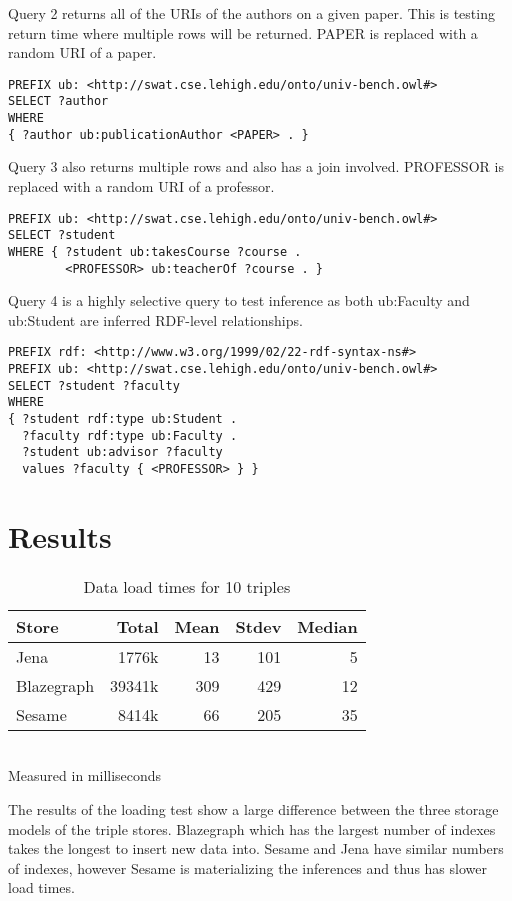 \documentclass{llncs}
\begin{document}
\smallskip

Query 2 returns all of the URIs of the authors on a given paper.  This is testing return time where multiple rows will be returned.  PAPER is replaced with a random URI of a paper.

\begin{lstlisting}[caption=Query 2]
PREFIX ub: <http://swat.cse.lehigh.edu/onto/univ-bench.owl#>
SELECT ?author
WHERE
{ ?author ub:publicationAuthor <PAPER> . }
\end{lstlisting}
\smallskip

Query 3 also returns multiple rows and also has a join involved.  PROFESSOR is replaced with a random URI of a professor.

\begin{lstlisting}[caption=Query 3]
PREFIX ub: <http://swat.cse.lehigh.edu/onto/univ-bench.owl#>
SELECT ?student
WHERE { ?student ub:takesCourse ?course .
        <PROFESSOR> ub:teacherOf ?course . }
\end{lstlisting}

\smallskip

Query 4 is a highly selective query to test inference as both ub:Faculty and ub:Student are inferred RDF-level relationships.

\begin{lstlisting}[caption=Query 4]
PREFIX rdf: <http://www.w3.org/1999/02/22-rdf-syntax-ns#>
PREFIX ub: <http://swat.cse.lehigh.edu/onto/univ-bench.owl#>
SELECT ?student ?faculty
WHERE
{ ?student rdf:type ub:Student .
  ?faculty rdf:type ub:Faculty .
  ?student ub:advisor ?faculty 
  values ?faculty { <PROFESSOR> } }
\end{lstlisting}

\section{Results}
\begin{table}
\begin{center}
\caption{Data load times for 10 triples}
\begin{tabular}{l | r r r r }
Store & Total & Mean & Stdev & Median \\
\hline
Jena & 1776k & 13 & 101 & 5 \\
Blazegraph & 39341k & 309 & 429 & 12 \\
Sesame & 8414k & 66 & 205 & 35
\end{tabular}
\\[5pt]
Measured in milliseconds
\end{center}
\end{table}
The results of the loading test show a large difference between the three storage models of the triple stores.  Blazegraph which has the largest number of indexes takes the longest to insert new data into. Sesame and Jena have similar numbers of indexes, however Sesame is materializing the inferences and thus has slower load times.
\end{document}
